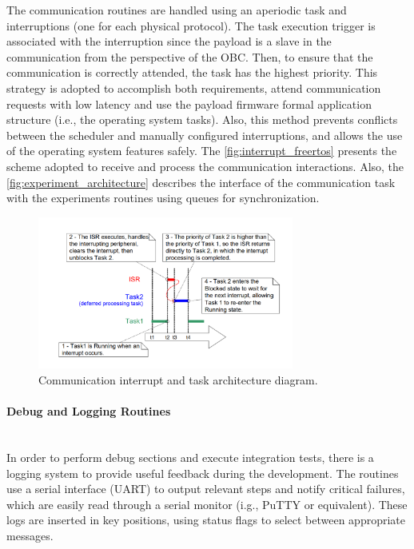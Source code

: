 The communication routines are handled using an aperiodic task and interruptions (one for each physical protocol). The task execution trigger is associated with the interruption since the payload is a slave in the communication from the perspective of the OBC. Then, to ensure that the communication is correctly attended, the task has the highest priority. This strategy is adopted to accomplish both requirements, attend communication requests with low latency and use the payload firmware formal application structure (i.e., the operating system tasks). Also, this method prevents conflicts between the scheduler and manually configured interruptions, and allows the use of the operating system features safely. The \autoref{fig:interrupt_freertos} presents the scheme adopted to receive and process the communication interactions. Also, the \autoref{fig:experiment_architecture} describes the interface of the communication task with the experiments routines using queues for synchronization.

\begin{figure}[!ht]
    \begin{center}
        \includegraphics[width=0.75\textwidth]{figures/interrupt_freertos.png}
        \caption{Communication interrupt and task architecture diagram.}
        \label{fig:interrupt_freertos}
    \end{center}
\end{figure}

\paragraph{Debug and Logging Routines} \mbox{}\\

In order to perform debug sections and execute integration tests, there is a logging system to provide useful feedback during the development. The routines use a serial interface (UART) to output relevant steps and notify critical failures, which are easily read through a serial monitor (i.g., PuTTY or equivalent). These logs are inserted in key positions, using status flags to select between appropriate messages.

